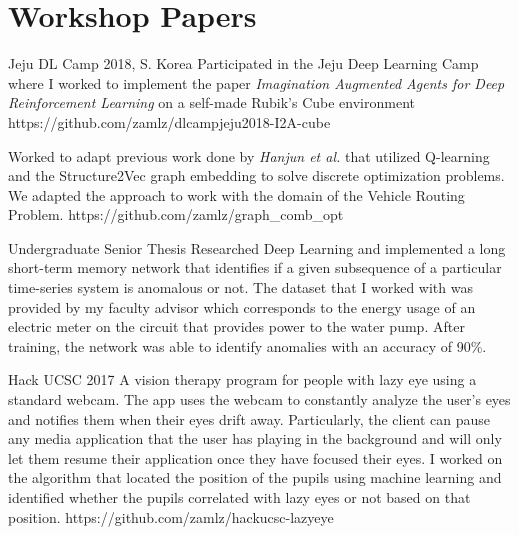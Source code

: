 \documentclass{cv}
\begin{document}
\section{Workshop Papers}
\begin{adjustwidth}{0.5cm}{0.5cm}

\vspace{0.25cm}
\end{adjustwidth}

\begin{adjustwidth}{0.5cm}{0.5cm}

{Jeju DL Camp 2018, S. Korea}
{Participated in the Jeju Deep Learning Camp where I worked to
implement the paper \textit{Imagination Augmented Agents for
Deep Reinforcement Learning} on a self-made Rubik's Cube environment}
{https://github.com/zamlz/dlcampjeju2018-I2A-cube}

{Worked to adapt previous work done by \textit{Hanjun et al.} that utilized
Q-learning and the Structure2Vec graph embedding to solve discrete optimization
problems. We adapted the approach to work with the domain of the Vehicle
Routing Problem.}
{https://github.com/zamlz/graph_comb_opt}

{Undergraduate Senior Thesis}
{Researched Deep Learning and implemented a long short-term memory
network that identifies if a given subsequence of a particular
time-series system is anomalous or not. The dataset that I worked with
was provided by my faculty advisor which corresponds to the energy usage
of an electric meter on the circuit that provides power to the water
pump. After training, the network was able to identify anomalies with
an accuracy of 90\%.}{}

{Hack UCSC 2017}
{A vision therapy program for people with lazy eye using a standard
webcam. The app uses the webcam to constantly analyze the user's eyes
and notifies them when their eyes drift away. Particularly, the client
can pause any media application that the user has playing in the
background and will only let them resume their application once they
have focused their eyes. I worked on the algorithm that located the
position of the pupils using machine learning and identified whether
the pupils correlated with lazy eyes or not based on that position.}
{https://github.com/zamlz/hackucsc-lazyeye}


\end{adjustwidth}
\end{document}
